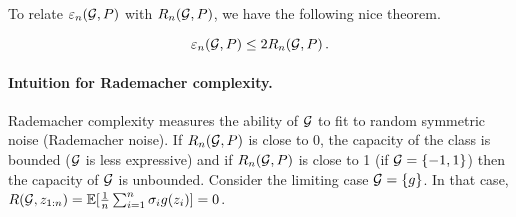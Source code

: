 \documentclass[twoside]{article}
\newcommand{\set}[1]{\left\{#1\right\}}
\begin{document}
To relate $\varepsilon_n(\mathcal{G}, P)$ with $R_n(\mathcal{G}, P)$, we have the following nice theorem. 
\begin{theorem}
    \[
        \varepsilon_n(\mathcal{G}, P) \le 2 R_n(\mathcal{G}, P) \,.
    \]
\end{theorem}

\paragraph{Intuition for Rademacher complexity.} Rademacher complexity measures the ability of $\mathcal{G}$ to fit to random symmetric noise (Rademacher noise). If $R_n(\mathcal{G}, P)$ is close to 0, the capacity of the class is bounded ($\mathcal{G}$ is less expressive) and if $R_n(\mathcal{G}, P)$ is close to 1 (if  $\cG = \set{-1,1}$) then the capacity of $\mathcal{G}$ is unbounded. Consider the limiting case $\cG = \set{g}$. In that case,  $R(\mathcal{G}, z_{1:n}) = \mathbb{E}[\frac1n \sum_{i=1}^n \sigma_i g(z_i)] = 0$.
 
\end{document}
